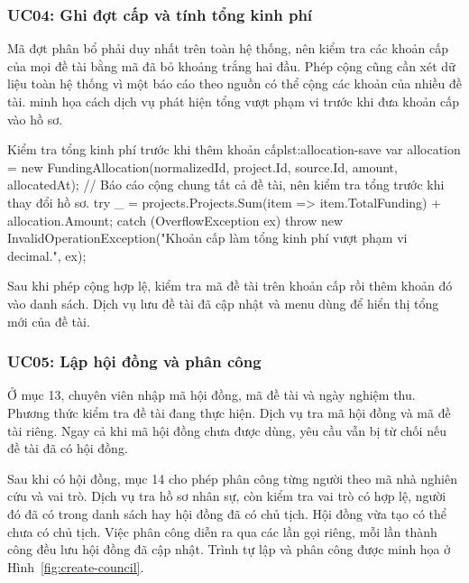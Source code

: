 \subsubsection{UC04: Ghi đợt cấp và tính tổng kinh phí}

Mã đợt phân bổ phải duy nhất trên toàn hệ thống, nên  kiểm tra các khoản cấp của mọi đề tài bằng mã đã bỏ khoảng trắng hai đầu. Phép cộng cũng cần xét dữ liệu toàn hệ thống vì một báo cáo theo nguồn có thể cộng các khoản của nhiều đề tài.  minh họa cách dịch vụ phát hiện tổng vượt phạm vi  trước khi đưa khoản cấp vào hồ sơ.

\begin{ReportCode}[firstnumber=32,gobble=8]{Kiểm tra tổng kinh phí trước khi thêm khoản cấp}{lst:allocation-save}
        var allocation = new FundingAllocation(normalizedId, project.Id, source.Id, amount, allocatedAt);
        // Báo cáo cộng chung tất cả đề tài, nên kiểm tra tổng trước khi thay đổi hồ sơ.
        try
        {
            _ = projects.Projects.Sum(item => item.TotalFunding) + allocation.Amount;
        }
        catch (OverflowException ex)
        {
            throw new InvalidOperationException("Khoản cấp làm tổng kinh phí vượt phạm vi decimal.", ex);
        }
\end{ReportCode}

Sau khi phép cộng hợp lệ,  kiểm tra mã đề tài trên khoản cấp rồi thêm khoản đó vào danh sách. Dịch vụ lưu đề tài đã cập nhật và menu dùng  để hiển thị tổng mới của đề tài.

\subsubsection{UC05: Lập hội đồng và phân công}

Ở mục 13, chuyên viên nhập mã hội đồng, mã đề tài và ngày nghiệm thu. Phương thức  kiểm tra đề tài đang thực hiện. Dịch vụ tra mã hội đồng và mã đề tài riêng. Ngay cả khi mã hội đồng chưa được dùng, yêu cầu vẫn bị từ chối nếu đề tài đã có hội đồng.

Sau khi có hội đồng, mục 14 cho phép phân công từng người theo mã nhà nghiên cứu và vai trò. Dịch vụ tra hồ sơ nhân sự, còn  kiểm tra vai trò có hợp lệ, người đó đã có trong danh sách hay hội đồng đã có chủ tịch. Hội đồng vừa tạo có thể chưa có chủ tịch. Việc phân công diễn ra qua các lần gọi riêng, mỗi lần thành công đều lưu hội đồng đã cập nhật. Trình tự lập và phân công được minh họa ở Hình~\ref{fig:create-council}.

